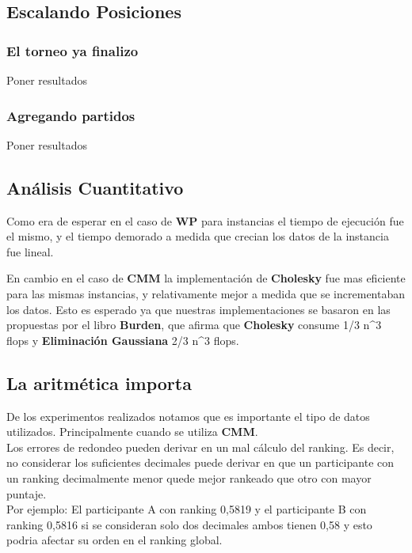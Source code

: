 \subsection{Escalando Posiciones}

\subsubsection{El torneo ya finalizo}

Poner resultados


\subsubsection{Agregando partidos}

Poner resultados



\subsection{Análisis Cuantitativo}

Como era de esperar en el caso de \textbf{WP} para instancias el tiempo de ejecución fue el mismo, y el tiempo demorado a medida que crecian los datos de la instancia fue lineal.

En cambio en el caso de \textbf{CMM} la implementación de \textbf{Cholesky} fue mas eficiente para las mismas instancias, y relativamente mejor a medida que se incrementaban los datos. 
Esto es esperado ya que nuestras implementaciones se basaron en las propuestas por el libro \textbf{Burden}, que afirma que \textbf{Cholesky} consume 1/3 {n^3} flops y \textbf{Eliminación Gaussiana} 2/3 {n^3} flops.


\subsection{La aritmética importa}

De los experimentos realizados notamos que es importante el tipo de datos utilizados. Principalmente cuando se utiliza \textbf{CMM}.
\\

Los errores de redondeo pueden derivar en un mal cálculo del ranking. Es decir, no considerar los suficientes decimales puede derivar en que un participante con un ranking
decimalmente menor quede mejor rankeado que otro con mayor puntaje.\\

Por ejemplo: El participante A con ranking 0,5819 y el participante B con ranking 0,5816 si se consideran solo dos decimales ambos tienen 0,58 y esto podria afectar su orden 
en el ranking global. \\

